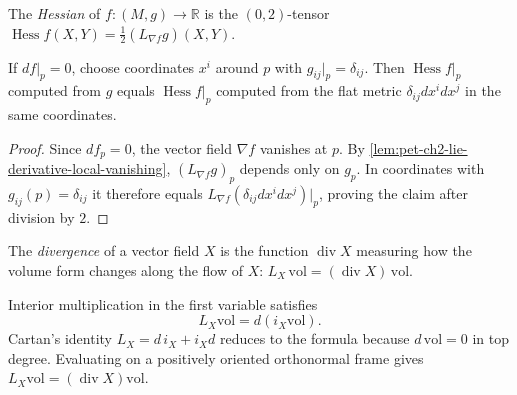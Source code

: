 \begin{definition}
  \label{def:pet-ch2-hessian-lie-derivative}


  The \emph{Hessian} of $f:(M,g)\to\mathbb{R}$ is the $(0,2)$-tensor
  $\operatorname{Hess}f(X,Y)=\frac12(L_{\nabla f}g)(X,Y)$.
\end{definition}

\begin{proposition}
  \label{prop:pet-ch2-hessian-critical-point}


  If $df|_p=0$, choose coordinates $x^i$ around $p$ with $g_{ij}|_p=\delta_{ij}$.
  Then $\operatorname{Hess}f|_p$ computed from $g$ equals $\operatorname{Hess}f|_p$
  computed from the flat metric $\delta_{ij}dx^idx^j$ in the same coordinates.
\end{proposition}
\begin{proof}

  \sketch
  Since $df_p=0$, the vector field
  $\nabla f$ vanishes at $p$. By
  \cref{lem:pet-ch2-lie-derivative-local-vanishing},
  $(L_{\nabla f}g)_p$ depends only on $g_p$. In coordinates with
  $g_{ij}(p)=\delta_{ij}$ it therefore equals
  $L_{\nabla f}(\delta_{ij}dx^i dx^j)|_p$, proving the claim after division
  by $2$.
\end{proof}

\begin{definition}
  \label{def:pet-ch2-divergence-lie-derivative}


  The \emph{divergence} of a vector field $X$ is the function $\operatorname{div}X$
  measuring how the volume form changes along the flow of $X$:
  $L_X\,\mathrm{vol}=(\operatorname{div}X)\,\mathrm{vol}$.
\end{definition}

\begin{remark}
  \label{rem:pet-ch2-lie-derivative-volume-exact}


  Interior multiplication in
  the first variable satisfies
  \[
    L_X\mathrm{vol}=d(i_X\mathrm{vol}).
  \]
  \sketch
  Cartan's identity $L_X=d\,i_X+i_Xd$ reduces to the formula because
  $d\,\mathrm{vol}=0$ in top degree. Evaluating on a positively oriented
  orthonormal frame gives
  $L_X\mathrm{vol}=(\operatorname{div}X)\mathrm{vol}$.
\end{remark}

